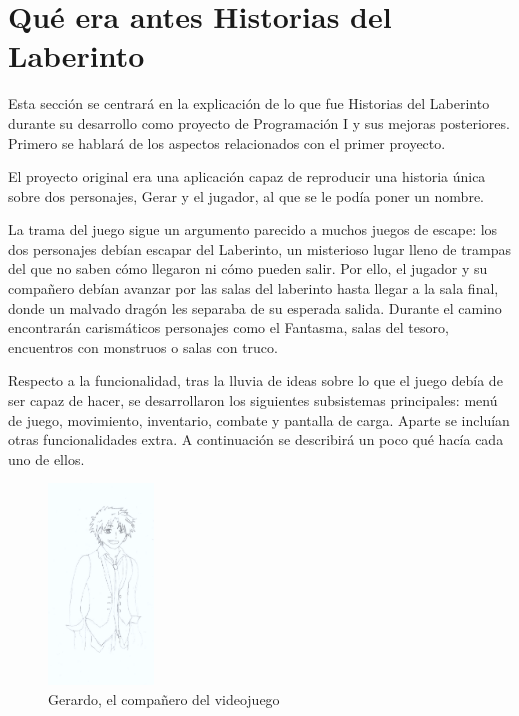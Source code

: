 \newpage
\section{Qué era antes Historias del Laberinto}

Esta sección se centrará en la explicación de lo que fue Historias del Laberinto durante su desarrollo como proyecto de Programación I y sus mejoras posteriores.
Primero se hablará de los aspectos relacionados con el primer proyecto.

El proyecto original era una aplicación capaz de reproducir una historia única sobre dos personajes, Gerar y el jugador, al que se le podía poner un nombre.

La trama del juego sigue un argumento parecido a muchos juegos de escape: los dos personajes debían escapar del Laberinto, un misterioso lugar lleno de trampas del que no saben cómo llegaron ni cómo pueden salir. Por ello, el jugador y su compañero debían avanzar por las salas del laberinto hasta llegar a la sala final, donde un malvado dragón les separaba de su esperada salida. Durante el camino encontrarán carismáticos personajes como el Fantasma, salas del tesoro, encuentros con monstruos o salas con truco.

Respecto a la funcionalidad, tras la lluvia de ideas sobre lo que el juego debía de ser capaz de hacer, se desarrollaron los siguientes subsistemas principales: menú de juego, movimiento, inventario, combate y pantalla de carga. Aparte se incluían otras funcionalidades extra.
A continuación se describirá un poco qué hacía cada uno de ellos.

\begin{figure}[h]
	\caption{Gerardo, el compañero del videojuego}
	\centering
	\includegraphics[width=0.25\textwidth]{include/GerardoPres.png}
\end{figure}

